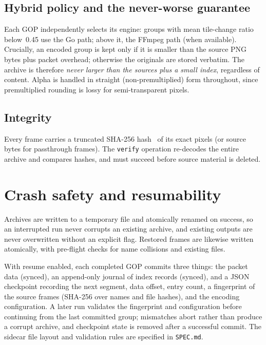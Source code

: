 \documentclass[11pt,a4paper]{article}
\begin{document}
\subsection{Hybrid policy and the never-worse guarantee}

Each GOP independently selects its engine: groups with mean tile-change ratio
below~0.45 use the Go path; above it, the FFmpeg path (when available).
Crucially, an encoded group is kept only if it is smaller than the source PNG
bytes plus packet overhead; otherwise the originals are stored verbatim.
The archive is therefore \emph{never larger than the sources plus a small
index}, regardless of content. Alpha is handled in straight (non-premultiplied)
form throughout, since premultiplied rounding is lossy for semi-transparent
pixels.

\subsection{Integrity}

Every frame carries a truncated SHA-256 hash~\cite{sha2} of its exact pixels (or source
bytes for passthrough frames). The \texttt{verify} operation re-decodes the
entire archive and compares hashes, and must succeed before source material is
deleted.

\section{Crash safety and resumability}
\label{sec:resume}

Archives are written to a temporary file and atomically renamed on success, so
an interrupted run never corrupts an existing archive, and existing outputs
are never overwritten without an explicit flag. Restored frames are likewise
written atomically, with pre-flight checks for name collisions and existing
files.

With resume enabled, each completed GOP commits three things: the packet data
(synced), an append-only journal of index records (synced), and a JSON
checkpoint recording the next segment, data offset, entry count, a fingerprint
of the source frames (SHA-256 over names and file hashes), and the encoding
configuration. A later run validates the fingerprint and configuration before
continuing from the last committed group; mismatches abort rather than produce
a corrupt archive, and checkpoint state is removed after a successful commit.
The sidecar file layout and validation rules are specified in
\texttt{SPEC.md}.
\end{document}
